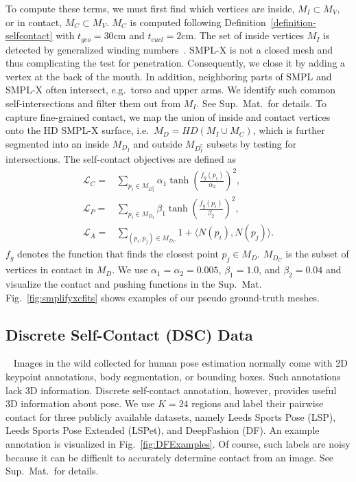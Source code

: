 \documentclass[final]{cvpr}
\renewcommand{\ie}{i.e.\xspace}
\newcommand{\suppmat}{Sup.~Mat.\xspace}
\newcommand{\inp}[2]{\langle #1, #2 \rangle}
\newcommand{\geoth}{t_{\mathit{geo}}}
\newcommand{\euclth}{t_{\mathit{eucl}}}
\theoremstyle{definition}
\begin{document}
To compute these terms, we must first find which vertices are inside, $M_{I} \subset M_V$, or in contact, $M_{C} \subset M_V$. 
$M_{C}$ is computed following Definition~\ref{definition-selfcontact} with $\geoth = 30$cm and $\euclth = 2$cm.
The set of inside vertices $M_{I}$ is detected by generalized winding numbers~\cite{jacobson2013robust}. 
SMPL-X is not a closed mesh and thus complicating the test for penetration.
Consequently, we close it by adding a vertex at the back of the mouth.
In addition, neighboring parts of SMPL and SMPL-X often intersect, e.g.~torso and upper arms.
We identify such common self-intersections and filter them out from $M_{I}$. See Sup.~Mat.~for details.
To capture fine-grained contact, we map the union of inside and contact vertices onto the HD SMPL-X surface, \ie~$M_D = \mathit{HD}(M_{I} \cup M_{C})$, 
which is further segmented into an inside $M_{D_I}$ and outside $M_{D_I^{\complement}}$ subsets by testing for intersections. 
The self-contact objectives are defined as 
\begin{align*}
\mathcal{L}_{C} = & \sum_{p_i \in M_{D_I^{\complement}}} \alpha_1 \tanh(\frac{f_{g}(p_i)}{\alpha_2})^2 \text{,} \\
\mathcal{L}_{P} = & \sum_{p_i \in M_{D_I}} \beta_1 \tanh(\frac{f_{g}(p_i)}{\beta_2})^2 \text{,} \\
\mathcal{L}_{A} = & \sum_{(p_i, p_j) \in M_{D_C}} 1 + \inp{N(p_i)}{N(p_j)} \text{.}
\end{align*}
$f_{g}$ denotes the function that finds the closest point $p_j \in M_D$. $M_{D_C}$ is the subset of vertices in contact in $M_D$. 
We use $\alpha_1 = \alpha_2 = 0.005$, $\beta_1 = 1.0$, and $\beta_2 = 0.04$ and visualize the contact and pushing functions in the {\suppmat} 
Fig.~\ref{fig:smplifyxcfits} shows examples of our pseudo ground-truth meshes.

\subsection{Discrete Self-Contact (DSC) Data}~\label{subsection-dsc}
Images in the wild collected for human pose estimation normally come with 2D keypoint annotations, body segmentation, or bounding boxes. 
Such annotations lack 3D information. 
Discrete self-contact annotation, however, provides useful 3D information about pose. 
We use $K = 24$ regions and label their pairwise contact for three publicly available datasets, namely Leeds Sports Pose (LSP), Leeds Sports Pose Extended (LSPet), and DeepFashion (DF). An example annotation is visualized in Fig.~\ref{fig:DFExamples}.
Of course, such labels are noisy because it can be difficult to accurately determine contact from an image. See \suppmat~for details.
\end{document}
